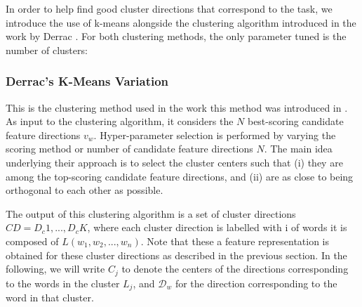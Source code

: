 


In order to help find good cluster directions that correspond to the task, we introduce the use of k-means alongside the clustering algorithm introduced in the work by Derrac \cite{Derrac2015}. For both clustering methods, the only parameter tuned is the number of clusters:










\subsubsection{Derrac's K-Means Variation} 

This is the clustering method used in the work this method was introduced in \cite{Derrac2015}.  As input to the clustering algorithm, it considers the $N$ best-scoring candidate feature directions $v_w$. Hyper-parameter selection is performed by varying the scoring method or number of candidate feature directions $N$. The main idea underlying their approach is to select the cluster centers such that (i) they are among the top-scoring candidate feature directions, and (ii) are as close to being orthogonal to each other as possible. 
 
The output of this clustering algorithm is a set of cluster directions ${CD} = D_c1,...,D_cK$, where each cluster direction is labelled with i of words it is composed of  $L(w_1, w_2, ..., w_n)$. Note that these a feature representation is obtained for these cluster directions as described in the previous section. In the following, we will write   ${C}_j$  to denote the centers of the directions corresponding to the words in the cluster $L_j$, and $\mathcal{D}_w$ for the direction corresponding to the word in that cluster.

